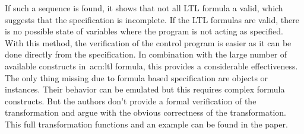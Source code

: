 If such a sequence is found, it shows that not all LTL formula a valid, which suggests that the specification is incomplete.
If the LTL formulas are valid, there is no possible state of variables where the program is not acting as specified.
With this method, the verification of the control program is easier as it can be done directly from the specification.
In combination with the large number of available constructs in~\acrshort{acn:ltl} formula, this provides a considerable effectiveness.
The only thing missing due to formula based specification are objects or instances.
Their behavior can be emulated but this requires complex formula constructs.
But the authors don't provide a formal verification of the transformation and argue with the obvious correctness of the transformation.
This full transformation functions and an example can be found in the paper.

